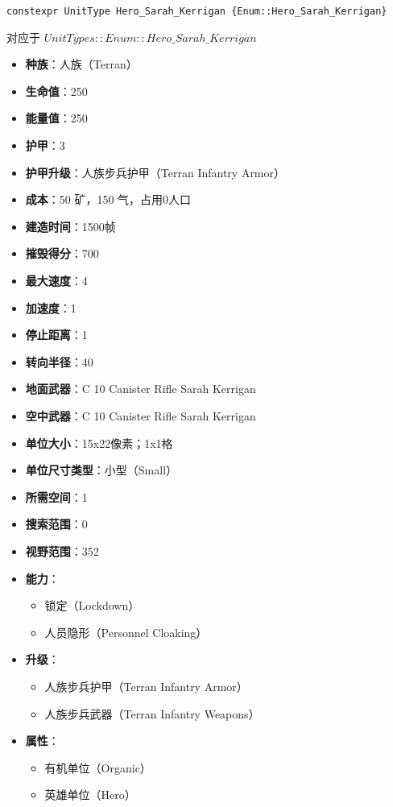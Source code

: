 \begin{tcolorbox}[colback=white, colframe=black!60!white, title=Hero\_Sarah\_Kerrigan(), arc=0mm]
    \begin{verbatim}
constexpr UnitType Hero_Sarah_Kerrigan {Enum::Hero_Sarah_Kerrigan}
    \end{verbatim}
    对应于  $ UnitTypes::Enum::Hero\_Sarah\_Kerrigan $ 
    \begin{itemize}
        \item \textbf{种族}：人族（Terran）
        \item \textbf{生命值}：250
        \item \textbf{能量值}：250
        \item \textbf{护甲}：3
        \item \textbf{护甲升级}：人族步兵护甲（Terran Infantry Armor）
        \item \textbf{成本}：50 矿，150 气，占用0人口
        \item \textbf{建造时间}：1500帧
        \item \textbf{摧毁得分}：700
        \item \textbf{最大速度}：4
        \item \textbf{加速度}：1
        \item \textbf{停止距离}：1
        \item \textbf{转向半径}：40
        \item \textbf{地面武器}：C 10 Canister Rifle Sarah Kerrigan
        \item \textbf{空中武器}：C 10 Canister Rifle Sarah Kerrigan
        \item \textbf{单位大小}：15x22像素；1x1格
        \item \textbf{单位尺寸类型}：小型（Small）
        \item \textbf{所需空间}：1
        \item \textbf{搜索范围}：0
        \item \textbf{视野范围}：352
        \item \textbf{能力}：
            \begin{itemize}
                \item 锁定（Lockdown）
                \item 人员隐形（Personnel Cloaking）
            \end{itemize}
        \item \textbf{升级}：
            \begin{itemize}
                \item 人族步兵护甲（Terran Infantry Armor）
                \item 人族步兵武器（Terran Infantry Weapons）
            \end{itemize}
        \item \textbf{属性}：
            \begin{itemize}
                \item 有机单位（Organic）
                \item 英雄单位（Hero）
            \end{itemize}
    \end{itemize}
\end{tcolorbox}

